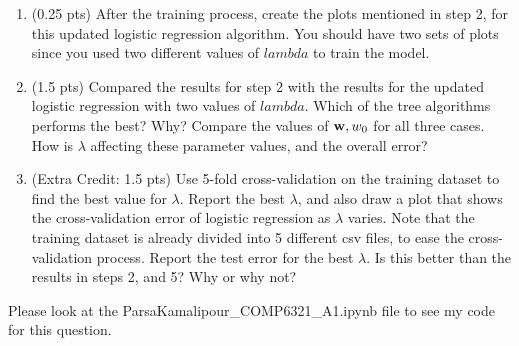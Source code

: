 \documentclass[10pt,letter,notitlepage]{article}
\newcommand{\blue}[1]{{\color{blue}#1}}
\newcounter{exercise}
\begin{document}
\begin{exercise}
\begin{enumerate}
    \item (0.25 pts) After the training process, create the plots mentioned in step 2, for this updated logistic regression algorithm. You should have two sets of plots since you used two different values of $lambda$ to train the model.  
    
    \item (1.5 pts) Compared the results for step 2 with the results for the updated logistic regression with two values of $lambda$. Which of the tree algorithms performs the best? Why? Compare the values of ${\bf w}, w_0$ for all three cases. How is $\lambda$ affecting these parameter values, and the overall error?

    \item (\blue{Extra Credit: 1.5 pts}) Use 5-fold cross-validation on the training dataset to find the best value for $\lambda$. Report the best $\lambda$, and also draw a plot that shows the cross-validation error of logistic regression as $\lambda$ varies. Note that the training dataset is already divided into 5 different csv files, to ease the cross-validation process. Report the test error for the best $\lambda$. Is this better than the results in steps 2, and 5? Why or why not?
    
\end{enumerate}

\end{exercise}




\begin{Answer}

	Please look at the ParsaKamalipour\_COMP6321\_A1.ipynb file to see my code for this question.

\end{Answer}



\vspace{+0.5cm}


\end{document}
